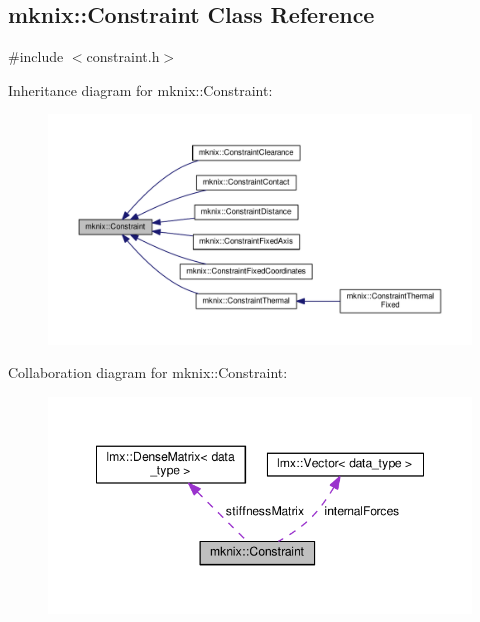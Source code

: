 \hypertarget{classmknix_1_1_constraint}{}\subsection{mknix\+:\+:Constraint Class Reference}
\label{classmknix_1_1_constraint}


{\ttfamily \#include $<$constraint.\+h$>$}



Inheritance diagram for mknix\+:\+:Constraint\+:\nopagebreak
\begin{figure}[H]
\begin{center}
\leavevmode
\includegraphics[width=350pt]{db/d85/classmknix_1_1_constraint__inherit__graph}
\end{center}
\end{figure}


Collaboration diagram for mknix\+:\+:Constraint\+:\nopagebreak
\begin{figure}[H]
\begin{center}
\leavevmode
\includegraphics[width=348pt]{d9/db6/classmknix_1_1_constraint__coll__graph}
\end{center}
\end{figure}
